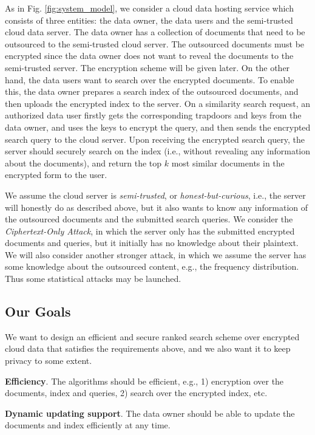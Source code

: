 \documentclass{IEEEtran}
\begin{document}
As in Fig. \ref{fig:system_model}, we consider a cloud data hosting service which consists of three entities: the data owner, the data users and the semi-trusted cloud data server. The data owner has a collection of documents that need to be outsourced to the semi-trusted cloud server. The outsourced documents must be encrypted since the data owner does not want to reveal the documents to the semi-trusted server. The encryption scheme will be given later. On the other hand, the data users want to search over the encrypted documents. To enable this, the data owner prepares a search index of the outsourced documents, and then uploads the encrypted index to the server. On a similarity search request, an authorized data user firstly gets the corresponding trapdoors and keys from the data owner, and uses the keys to encrypt the query, and then sends the encrypted search query to the cloud server. Upon receiving the encrypted search query, the server should securely search on the index (i.e., without revealing any information about the documents), and return the top $k$ most similar documents in the encrypted form to the user.

We assume the cloud server is \emph{semi-trusted}, or \emph{honest-but-curious}, i.e., the server will honestly do as described above, but it also wants to know any information of the outsourced documents and the submitted search queries. We consider the \emph{Ciphertext-Only Attack}, in which the server only has the submitted encrypted documents and queries, but it initially has no knowledge about their plaintext. We will also consider another stronger attack, in which we assume the server has some knowledge about the outsourced content, e.g., the frequency distribution. Thus some statistical attacks may be launched.

\subsection{Our Goals}
We want to design an efficient and secure ranked search scheme over encrypted cloud data that satisfies the requirements above, and we also want it to keep privacy to some extent.

\textbf{Efficiency}. The algorithms should be efficient, e.g., 1) encryption over the documents, index and queries, 2) search over the encrypted index, etc.

\textbf{Dynamic updating support}. The data owner should be able to update the documents and index efficiently at any time.
\end{document}
